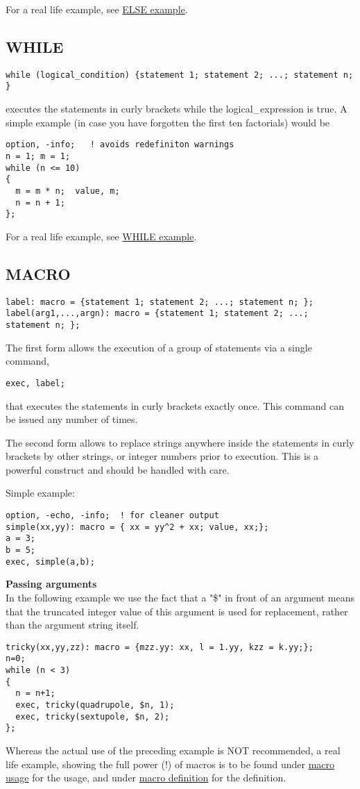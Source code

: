 For a real life example, see \href{foot.html}{ELSE example}. 


\subsection{WHILE}
\begin{verbatim}
while (logical_condition) {statement 1; statement 2; ...; statement n; }
\end{verbatim}  
executes the statements in curly brackets while the logical\_expression
is true. A simple example (in case you have forgotten the first ten
factorials) would be  
\begin{verbatim}
option, -info;   ! avoids redefiniton warnings
n = 1; m = 1;
while (n <= 10)
{
  m = m * n;  value, m;
  n = n + 1;
};
\end{verbatim}

For a real life example, see \href{foot.html}{WHILE example}.

\subsection{MACRO}
\begin{verbatim}
label: macro = {statement 1; statement 2; ...; statement n; };
label(arg1,...,argn): macro = {statement 1; statement 2; ...; statement n; };
\end{verbatim} 
The first form allows the execution of a group of statements via a
single command,  
\begin{verbatim}
exec, label;
\end{verbatim} 
that executes the statements in curly brackets exactly once. This command
can be issued any number of times.  

The second form allows to replace strings anywhere inside the statements
in curly brackets by other strings, or integer numbers prior to
execution. This is a powerful construct and should be handled with care.  

Simple example: 
\begin{verbatim}
option, -echo, -info;  ! for cleaner output
simple(xx,yy): macro = { xx = yy^2 + xx; value, xx;};
a = 3;
b = 5;
exec, simple(a,b);
\end{verbatim}


{\bf Passing arguments}\\
In the following example we use the fact that a "\$" in front of an
argument means that the truncated integer value of this argument is used
for replacement, rather than the argument string itself.  
\begin{verbatim}
tricky(xx,yy,zz): macro = {mzz.yy: xx, l = 1.yy, kzz = k.yy;};
n=0;
while (n < 3)
{
  n = n+1;
  exec, tricky(quadrupole, $n, 1);
  exec, tricky(sextupole, $n, 2);
};
\end{verbatim} 
Whereas the actual use of the preceding example is NOT recommended,
a real life example, showing the full power (!) of macros is to be
found under \href{foot.html}{macro usage} for the usage, and
under \href{foot.html#macro}{macro definition} for the
definition.


